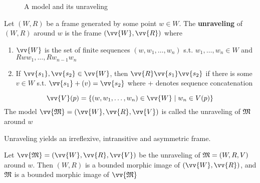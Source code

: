 \documentclass[11pt]{article}
\begin{document}
\begin{figure}
\centering
\begin{subfigure}[b]{0.4\textwidth}
\end{subfigure}
\begin{subfigure}[b]{0.4\textwidth}
\end{subfigure}
\caption{A model and its unraveling}
\end{figure}


\begin{definition}[Unraveling]
Let \((W,R)\) be a frame generated by some point \(w\in W\). The \textbf{unraveling}
of \((W,R)\) around \(w\) is the frame \((\vv{W},\vv{R})\) where
\begin{enumerate}
\item \(\vv{W}\) is the set of finite sequences \((w,w_1,\dots,w_n)\) s.t.
\(w_1,\dots,w_n\in W\) and \(Rww_1,\dots,Rw_{n-1}w_n\)
\item If \(\vv{s_1},\vv{s_2}\in\vv{W}\), then \(\vv{R}\vv{s_1}\vv{s_2}\) if
there is some \(v\in W\) s.t. \(\vv{s_1}+(v)=\vv{s_2}\) where + denotes
sequence concatenation
\end{enumerate}


\begin{equation*}
\vv{V}(p)=\{(w,w_1,\dots,w_n)\in\vv{W}\mid w_n\in V(p)\}
\end{equation*}
The model \(\vv{\fM}=(\vv{W},\vv{R},\vv{V})\)  is called the unraveling of
\(\mathfrak{M}\) around \(w\)
\end{definition}

Unraveling yields an irreflexive, intransitive and asymmetric frame.

\begin{lemma}[]
Let \(\vv{\fM}=(\vv{W},\vv{R},\vv{V})\) be the unraveling of \(\mathfrak{M}=(W,R,V)\)
around \(w\). Then \((W,R)\) is a bounded morphic image of
\((\vv{W},\vv{R})\), and \(\mathfrak{M}\) is a bounded morphic image of \(\vv{\fM}\)
\end{lemma}
\end{document}
